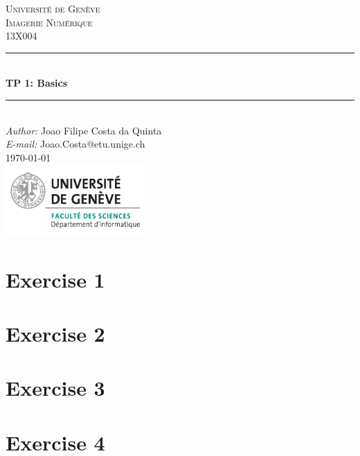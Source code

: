 \documentclass[a4paper]{article}
\makeatletter
\newcommand\TPid{1}
\newcommand\TPname{Basics}
\newcommand\Firstname{Joao Filipe}
\newcommand\Familyname{Costa da Quinta}
\newcommand\Email{Joao.Costa@etu.unige.ch}
\makeatother
\begin{document}
\begin{titlepage}

\newcommand{\HRule}{\rule{\linewidth}{0.5mm}} 							%
\newcommand\tab[1][1cm]{\hspace*{#1}}
\center 
 
\textsc{\LARGE Université de Genève}\\[1cm]

\textsc{\Large Imagerie Numérique}\\[0.2cm]
\textsc{\large 13X004}\\[1cm] 										%
\HRule \\[0.8cm]
{ \huge \bfseries TP \TPid : \TPname}\\[0.7cm]								%
\HRule \\[2cm]
\large
\emph{Author:} \Firstname \; \Familyname\\[0.5cm]		
\emph{E-mail:} {\color{blue}\Email}\\[7cm]		
{\large \today}\\[2cm]
\includegraphics[width=0.4\textwidth]{images/unige_csd.png}\\[1cm] 	%
\vfill 
\end{titlepage}


\section*{Exercise 1}

\section*{Exercise 2}

\section*{Exercise 3}

\section*{Exercise 4}
\end{document}
